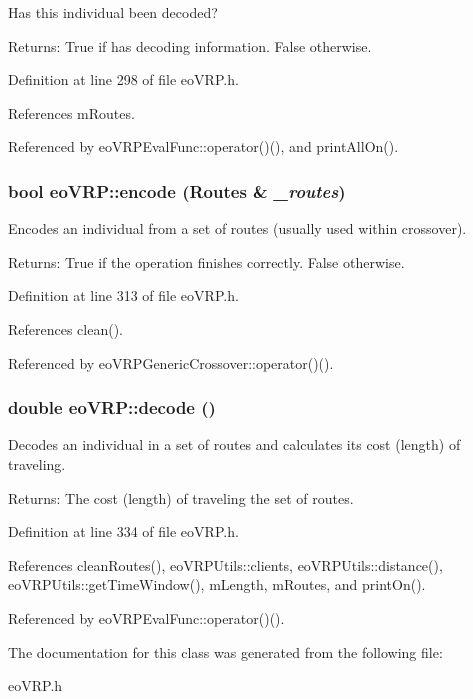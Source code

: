 Has this individual been decoded? 

\begin{Desc}
\item[Returns:]True if has decoding information. False otherwise. \end{Desc}


Definition at line 298 of file eo\-VRP.h.

References m\-Routes.

Referenced by eo\-VRPEval\-Func::operator()(), and print\-All\-On().
\subsubsection{\setlength{\rightskip}{0pt plus 5cm}bool eo\-VRP::encode (Routes \& {\em \_\-routes})\hspace{0.3cm}{\tt  [inline]}}\label{classeo_v_r_p_b56c820bff344b4cd7338628a6f8f083}


Encodes an individual from a set of routes (usually used within crossover). 

\begin{Desc}
\item[Returns:]True if the operation finishes correctly. False otherwise. \end{Desc}


Definition at line 313 of file eo\-VRP.h.

References clean().

Referenced by eo\-VRPGeneric\-Crossover::operator()().
\subsubsection{\setlength{\rightskip}{0pt plus 5cm}double eo\-VRP::decode ()\hspace{0.3cm}{\tt  [inline]}}\label{classeo_v_r_p_fdfd2633515baa85c3fdaf39be6dea5c}


Decodes an individual in a set of routes and calculates its cost (length) of traveling. 

\begin{Desc}
\item[Returns:]The cost (length) of traveling the set of routes. \end{Desc}


Definition at line 334 of file eo\-VRP.h.

References clean\-Routes(), eo\-VRPUtils::clients, eo\-VRPUtils::distance(), eo\-VRPUtils::get\-Time\-Window(), m\-Length, m\-Routes, and print\-On().

Referenced by eo\-VRPEval\-Func::operator()().

The documentation for this class was generated from the following file:\begin{CompactItemize}
\item 
eo\-VRP.h\end{CompactItemize}
